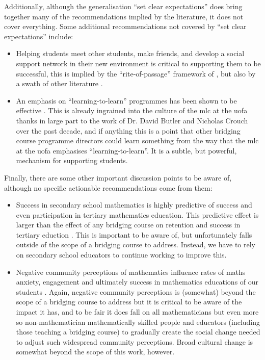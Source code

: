 \documentclass[twoside,12pt,a4paper]{report}
\begin{document}
Additionally, although the generalisation ``set clear expectations'' does bring together many of the recommendations implied by the literature, it does not cover everything. Some additional recommendations not covered by ``set clear expectations'' include:
\begin{itemize}
	\item Helping students meet other students, make friends, and develop a social support network in their new environment is critical to supporting them to be successful, this is implied by the ``rite-of-passage'' framework of \cite{Clark2008}, but also by a swath of other literature \cite{Trotter2006, Peat2001, Leese2010, Gordon2013}.
	\item An emphasis on ``learning-to-learn'' programmes has been shown to be effective \cite{Zeegers2001}. This is already ingrained into the culture of the \gls{mlc} at the \gls{uofa} thanks in large part to the work of Dr. David Butler and Nicholas Crouch over the past decade, and if anything this is a point that other bridging course programme directors could learn something from the way that the \gls{mlc} at the \gls{uofa} emphasises ``learning-to-learn''. It is a subtle, but powerful, mechanism for supporting students.
\end{itemize}


Finally, there are some other important discussion points to be aware of, although no specific actionable recommendations come from them:
\begin{itemize}
	\item Success in secondary school mathematics is highly predictive of success and even participation in tertiary mathematics education. This predictive effect is larger than the effect of any bridging course on retention and success in tertiary eduction \cite{Kajander2005, Nicholas2015b}. This is important to be aware of, but unfortunately falls outside of the scope of a bridging course to address. Instead, we have to rely on secondary school educators to continue working to improve this.
	\item Negative community perceptions of mathematics influence rates of maths anxiety, engagement and ultimately success in mathematics educations of our students \cite{King2015, Gordon2013, Clark2008}. Again, negative community perceptions is (somewhat) beyond the scope of a bridging course to address but it is critical to be aware of the impact it has, and to be fair it does fall on all mathematicians but even more so non-mathematician mathematically skilled people and educators (including those teaching a bridging course) to gradually create the social change needed to adjust such widespread community perceptions. Broad cultural change is somewhat beyond the scope of this work, however.
\end{itemize}
\end{document}

